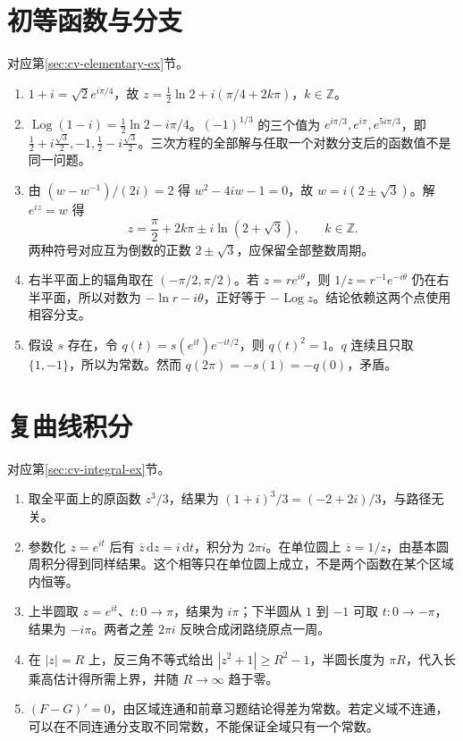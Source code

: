 \documentclass[UTF8,12pt,a4paper,fontset=fandol]{ctexbook}
\begin{document}
\section{初等函数与分支}
对应第\ref{sec:cv-elementary-ex}节。
\begin{enumerate}
 \item $1+i=\sqrt2e^{i\pi/4}$，故 $z=\tfrac12\ln2+i(\pi/4+2k\pi)$，$k\in\mathbb Z$。
 \item $\operatorname{Log}(1-i)=\tfrac12\ln2-i\pi/4$。$(-1)^{1/3}$ 的三个值为 $e^{i\pi/3},e^{i\pi},e^{5i\pi/3}$，即 $\tfrac12+i\tfrac{\sqrt3}2,-1,\tfrac12-i\tfrac{\sqrt3}2$。三次方程的全部解与任取一个对数分支后的函数值不是同一问题。
 \item 由 $(w-w^{-1})/(2i)=2$ 得 $w^2-4iw-1=0$，故 $w=i(2\pm\sqrt3)$。解 $e^{iz}=w$ 得
 \[
 z=\frac\pi2+2k\pi\pm i\ln(2+\sqrt3),\qquad k\in\mathbb Z.
 \]
 两种符号对应互为倒数的正数 $2\pm\sqrt3$，应保留全部整数周期。
 \item 右半平面上的辐角取在 $(-\pi/2,\pi/2)$。若 $z=re^{i\theta}$，则 $1/z=r^{-1}e^{-i\theta}$ 仍在右半平面，所以对数为 $-\ln r-i\theta$，正好等于 $-\operatorname{Log}z$。结论依赖这两个点使用相容分支。
 \item 假设 $s$ 存在，令 $q(t)=s(e^{it})e^{-it/2}$，则 $q(t)^2=1$。$q$ 连续且只取 $\{1,-1\}$，所以为常数。然而 $q(2\pi)=-s(1)=-q(0)$，矛盾。
\end{enumerate}

\section{复曲线积分}
对应第\ref{sec:cv-integral-ex}节。
\begin{enumerate}
 \item 取全平面上的原函数 $z^3/3$，结果为 $(1+i)^3/3=(-2+2i)/3$，与路径无关。
 \item 参数化 $z=e^{it}$ 后有 $\overline z\,\mathrm dz=i\,\mathrm dt$，积分为 $2\pi i$。在单位圆上 $\overline z=1/z$，由基本圆周积分得到同样结果。这个相等只在单位圆上成立，不是两个函数在某个区域内恒等。
 \item 上半圆取 $z=e^{it}$、$t:0\to\pi$，结果为 $i\pi$；下半圆从 $1$ 到 $-1$ 可取 $t:0\to-\pi$，结果为 $-i\pi$。两者之差 $2\pi i$ 反映合成闭路绕原点一周。
 \item 在 $|z|=R$ 上，反三角不等式给出 $|z^2+1|\ge R^2-1$，半圆长度为 $\pi R$，代入长乘高估计得所需上界，并随 $R\to\infty$ 趋于零。
 \item $(F-G)'=0$，由区域连通和前章习题结论得差为常数。若定义域不连通，可以在不同连通分支取不同常数，不能保证全域只有一个常数。
\end{enumerate}
\end{document}
